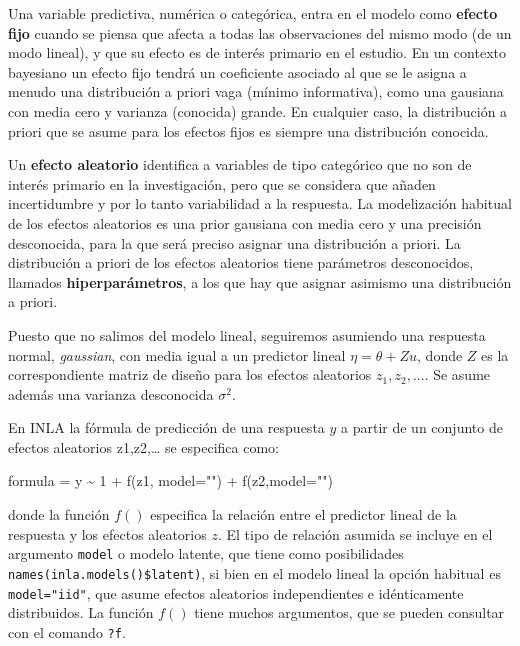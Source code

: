 \documentclass[
]{book}
\newenvironment{Shaded}{\begin{snugshade}}{\end{snugshade}}
\newcommand{\AttributeTok}[1]{\textcolor[rgb]{0.77,0.63,0.00}{#1}}
\newcommand{\DecValTok}[1]{\textcolor[rgb]{0.00,0.00,0.81}{#1}}
\newcommand{\FunctionTok}[1]{\textcolor[rgb]{0.00,0.00,0.00}{#1}}
\newcommand{\NormalTok}[1]{#1}
\newcommand{\OtherTok}[1]{\textcolor[rgb]{0.56,0.35,0.01}{#1}}
\newcommand{\SpecialCharTok}[1]{\textcolor[rgb]{0.00,0.00,0.00}{#1}}
\newcommand{\StringTok}[1]{\textcolor[rgb]{0.31,0.60,0.02}{#1}}
\begin{document}
Una variable predictiva, numérica o categórica, entra en el modelo como \textbf{efecto fijo} cuando se piensa que afecta a todas las observaciones del mismo modo (de un modo lineal), y que su efecto es de interés primario en el estudio.
En un contexto bayesiano un efecto fijo tendrá un coeficiente asociado al que se le asigna a menudo una distribución a priori vaga (mínimo informativa), como una gausiana con media cero y varianza (conocida) grande. En cualquier caso, la distribución a priori que se asume para los efectos fijos es siempre una distribución conocida.

Un \textbf{efecto aleatorio} identifica a variables de tipo categórico que no son de interés primario en la investigación, pero que se considera que añaden incertidumbre y por lo tanto variabilidad a la respuesta. La modelización habitual de los efectos aleatorios es una prior gausiana con media cero y una precisión desconocida, para la que será preciso asignar una distribución a priori. La distribución a priori de los efectos aleatorios tiene parámetros desconocidos, llamados \textbf{hiperparámetros}, a los que hay que asignar asimismo una distribución a priori.

Puesto que no salimos del modelo lineal, seguiremos asumiendo una respuesta normal, \emph{gaussian}, con media igual a un predictor lineal \(\eta=\theta+ Z u\), donde \(Z\) es la correspondiente matriz de diseño para los efectos aleatorios \(z_1, z_2,...\). Se asume además una varianza desconocida \(\sigma^2\).

En INLA la fórmula de predicción de una respuesta \(y\) a partir de un conjunto de efectos aleatorios z1,z2,\ldots{} se especifica como:

\begin{Shaded}
\begin{Highlighting}[]
\NormalTok{formula }\OtherTok{=}\NormalTok{ y }\SpecialCharTok{\textasciitilde{}} \DecValTok{1}  \SpecialCharTok{+} \FunctionTok{f}\NormalTok{(z1, }\AttributeTok{model=}\StringTok{""}\NormalTok{) }\SpecialCharTok{+} \FunctionTok{f}\NormalTok{(z2,}\AttributeTok{model=}\StringTok{""}\NormalTok{) }
\end{Highlighting}
\end{Shaded}

donde la función \(f()\) especifica la relación entre el predictor lineal de la respuesta y los efectos aleatorios \(z\). El tipo de relación asumida se incluye en el argumento \texttt{model} o modelo latente, que tiene como posibilidades \texttt{names(inla.models()\$latent)}, si bien en el modelo lineal la opción habitual es \texttt{model="iid"}, que asume efectos aleatorios independientes e idénticamente distribuidos. La función \(f()\) tiene muchos argumentos, que se pueden consultar con el comando \texttt{?f}.
\end{document}
